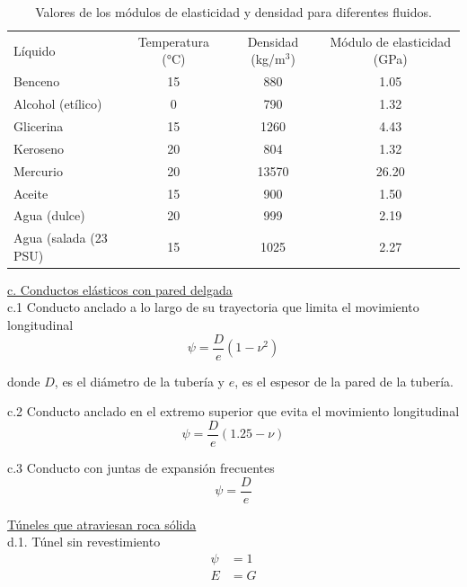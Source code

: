 \documentclass[letterpaper]{report}
\begin{document}
\begin{table}[H]
	\centering
	\caption{Valores de los módulos de elasticidad y densidad para diferentes fluidos.}
	\begin{tabular}{|l|c|c|c|}
		\rowcolor[HTML]{6200C9} 
		{\color[HTML]{FFFFFF} Líquido} & {\color[HTML]{FFFFFF} Temperatura (°C)} & {\color[HTML]{FFFFFF} Densidad (kg/m$^3$)} & {\color[HTML]{FFFFFF} Módulo de elasticidad (GPa)} \\
		Benceno               & 15  & 880    & 1.05\\ 
		Alcohol (etílico)     & 0   & 790    & 1.32\\
		Glicerina             & 15  & 1260   & 4.43\\
		Keroseno              & 20  & 804    & 1.32\\
		Mercurio              & 20  & 13570 & 26.20\\
		Aceite                & 15  & 900    & 1.50\\
		Agua (dulce)          & 20  & 999    & 2.19\\
		Agua (salada (23 PSU) & 15  & 1025   & 2.27  \\ \hline
	\end{tabular}
\label{tab:tab2}
\end{table}

\underline{c. Conductos elásticos con pared delgada}\\
c.1 Conducto anclado a lo largo de su trayectoria que limita el movimiento longitudinal
\begin{equation}
	\psi=\frac{D}{e}(1-\nu^2)
\end{equation}

donde $D$, es el diámetro de la tubería y $e$, es el espesor de la pared de la tubería.\bigskip

c.2 Conducto anclado en el extremo superior que evita el movimiento longitudinal
\begin{equation}
	\psi=\frac{D}{e}(1.25-\nu)
\end{equation}

c.3 Conducto con juntas de expansión frecuentes
\begin{equation}
	\psi=\frac{D}{e}
\end{equation}

\underline{Túneles que atraviesan roca sólida}\\
d.1. Túnel sin revestimiento
\begin{equation}
	\begin{aligned}
		\psi &= 1\\
		E &= G
	\end{aligned}
\end{equation}
\end{document}
